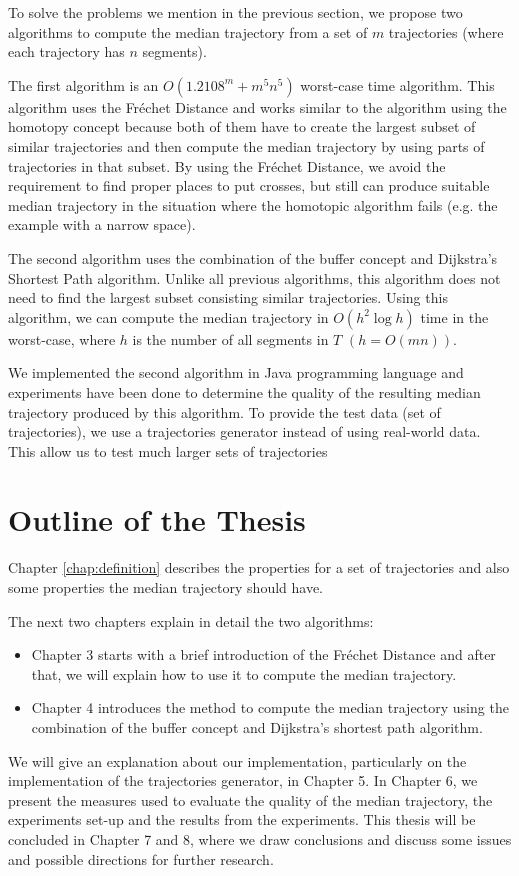 To solve the problems we mention in the previous section, we propose two algorithms to compute the median trajectory from a set of $m$ trajectories (where each trajectory has $n$ segments).

The first algorithm is an $O(1.2108^{m} + m^{5}n^{5})$ worst-case time algorithm.
This algorithm uses the Fr\'{e}chet Distance \cite{AltGodau:1995} and works similar to the algorithm using the homotopy concept because both of them have to create the largest subset of similar trajectories and then compute the median trajectory by using parts of trajectories in that subset. 
By using the Fr\'{e}chet Distance, we avoid the requirement to find proper places to put crosses, but still can produce suitable median trajectory in the situation where the homotopic algorithm fails (e.g. the example with a narrow space).

The second algorithm uses the combination of the buffer concept and Dijkstra's Shortest Path algorithm.
Unlike all previous algorithms, this algorithm does not need to find the largest subset consisting similar trajectories. 
Using this algorithm, we can compute the median trajectory in $O(h^{2} \log h)$ time in the worst-case, where $h$ is the number of all segments in $T$ $(h = O(mn))$.

We implemented the second algorithm in Java programming language and experiments have been done to determine the quality of the resulting median trajectory produced by this algorithm.
To provide the test data (set of trajectories), we use a trajectories generator instead of using real-world data.
This allow us to test much larger sets of trajectories

\section{Outline of the Thesis}
\label{sec:outline}

Chapter \ref{chap:definition} describes the properties for a set of trajectories and also some properties the median trajectory should have.

The next two chapters explain in detail the two algorithms:
\begin{itemize}
\item 
Chapter 3 starts with a brief introduction of the Fr\'{e}chet Distance and after that, we will explain how to use it to compute the median trajectory. 
\item 
Chapter 4 introduces the method to compute the median trajectory using the combination of the buffer concept and Dijkstra's shortest path algorithm. 
\end{itemize}

We will give an explanation about our implementation, particularly on the implementation of the trajectories generator, in Chapter 5.
In Chapter 6, we present the measures used to evaluate the quality of the median trajectory, the experiments set-up and the results from the experiments.
This thesis will be concluded in Chapter 7 and 8, where we draw conclusions and discuss some issues and possible directions for further research.

\lipsum[1-14]